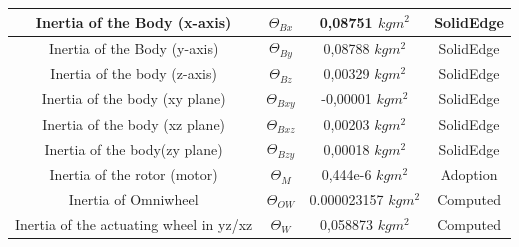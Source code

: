 \documentclass[twoside,colorback,accentcolor=tud4c,11pt]{tudreport}
\begin{document}
\begin{table}[]
\begin{tabular}{cccc}
\multicolumn{1}{|c|}{Inertia of the Body (x-axis)}                                                                      & \multicolumn{1}{c|}{$\Theta_{Bx}$}          & \multicolumn{1}{c|}{0,08751 $kgm^{2}$}     & \multicolumn{1}{c|}{SolidEdge}             \\ \hline
\multicolumn{1}{|c|}{Inertia of the Body (y-axis)}                                                                      & \multicolumn{1}{c|}{$\Theta_{By}$}          & \multicolumn{1}{c|}{0,08788 $kgm^{2}$}     & \multicolumn{1}{c|}{SolidEdge}             \\ \hline
\multicolumn{1}{|c|}{Inertia of the body (z-axis)}                                                                      & \multicolumn{1}{c|}{$\Theta_{Bz}$}          & \multicolumn{1}{c|}{0,00329 $kgm^{2}$}     & \multicolumn{1}{c|}{SolidEdge}             \\ \hline
\multicolumn{1}{|c|}{Inertia of the body (xy plane)}                                                                    & \multicolumn{1}{c|}{$\Theta_{Bxy}$}         & \multicolumn{1}{c|}{-0,00001 $kgm^{2}$}    & \multicolumn{1}{c|}{SolidEdge}             \\ \hline
\multicolumn{1}{|c|}{Inertia of the body (xz plane)}                                                                    & \multicolumn{1}{c|}{$\Theta_{Bxz}$}         & \multicolumn{1}{c|}{0,00203 $kgm^{2}$}     & \multicolumn{1}{c|}{SolidEdge}             \\ \hline
\multicolumn{1}{|c|}{Inertia of the body(zy plane)}                                                                     & \multicolumn{1}{c|}{$\Theta_{Bzy}$}         & \multicolumn{1}{c|}{0,00018 $kgm^{2}$}     & \multicolumn{1}{c|}{SolidEdge}             \\ \hline
\multicolumn{1}{|c|}{Inertia of the rotor (motor)}                                                                      & \multicolumn{1}{c|}{$\Theta_{M}$}           & \multicolumn{1}{c|}{0,444e-6 $kgm^{2}$}    & \multicolumn{1}{c|}{Adoption}              \\ \hline
\multicolumn{1}{|c|}{Inertia of Omniwheel}                                                                              & \multicolumn{1}{c|}{$\Theta_{OW}$}          & \multicolumn{1}{c|}{0.000023157 $kgm^{2}$} & \multicolumn{1}{c|}{Computed}              \\ \hline
\multicolumn{1}{|c|}{Inertia of the actuating wheel in yz/xz}                                                            & \multicolumn{1}{c|}{$\Theta_{W}$}           & \multicolumn{1}{c|}{0,058873 $kgm^{2}$}    & \multicolumn{1}{c|}{Computed}              \\ \hline

\end{tabular}
\end{table}
\end{document}
